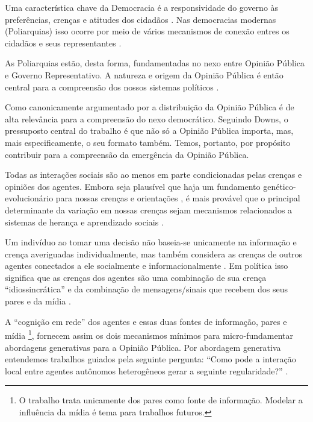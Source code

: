 Uma característica chave da Democracia é a responsividade do governo às
preferências, crenças e atitudes dos cidadãos
\cite{dahl1973polyarchy,bartels2003democracy}. Nas democracias modernas
(Poliarquias) isso ocorre por meio de vários mecanismos de conexão entres os
cidadãos e seus representantes \cite{dahl1989democracy,
  schumpeter2013capitalism}.

As Poliarquias estão, desta forma, fundamentadas no nexo entre Opinião Pública e
Governo Representativo. A natureza e origem da Opinião Pública é então
central para a compreensão dos nossos sistemas políticos
\cite{berelson1952democratic}.

Como canonicamente argumentado por  a distribuição
da Opinião Pública é de alta relevância para a compreensão do nexo democrático.
Seguindo Downs, o pressuposto central do trabalho é que não só a Opinião Pública
importa, mas, mais especificamente, o seu formato também. Temos, portanto, por
propósito contribuir para a compreensão da emergência da Opinião
Pública.

Todas as interações sociais são ao menos em parte condicionadas pelas crenças e
opiniões dos agentes. Embora seja plausível que haja um fundamento
genético-evolucionário para nossas crenças e orientações
\cite{fowler2008biology, fowler2013defense}, é mais provável que o principal
determinante da variação em  nossas crenças sejam  mecanismos relacionados a 
sistemas de herança e aprendizado sociais \cite{jablonka2014evolution}.

Um indivíduo ao tomar uma decisão não baseia-se unicamente na informação e
crença averiguadas individualmente, mas também considera as crenças de outros
agentes conectados a ele socialmente e informacionalmente
\cite{gintis2016individuality}. Em política isso significa que as crenças dos
agentes são uma combinação de sua crença ``idiossincrática'' e da combinação de
mensagens/sinais que recebem dos seus pares e da mídia
\cite{barabas2004deliberation,ryan2011social}.

A ``cognição em rede'' \cite{gintis2016individuality} dos agentes e essas duas
fontes de informação, pares e mídia \footnote{O trabalho trata unicamente dos
  pares como fonte de informação. Modelar a influência da mídia é tema para
  trabalhos futuros.}, fornecem assim os dois mecanismos mínimos para
micro-fundamentar abordagens generativas para a Opinião Pública. Por abordagem
generativa entendemos trabalhos guiados pela seguinte pergunta: ``Como pode a
interação local entre agentes autônomos heterogêneos gerar a seguinte
regularidade?'' \cite{epstein2006generative}.

